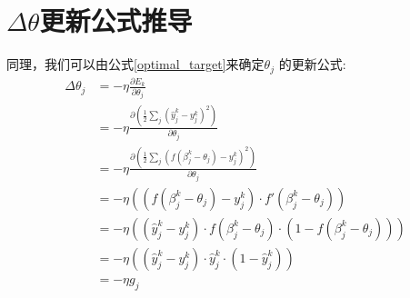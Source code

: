 \documentclass[11pt]{report}
\begin{document}
\section{$\Delta \theta$更新公式推导}
同理，我们可以由公式\ref{optimal_target}来确定$\theta_j$	的更新公式:
\begin{equation}
	\begin{split}
		\Delta \theta_j &=-\eta\frac{\partial E_k}{\partial \theta_j}\\
		&=-\eta\frac{\partial\left(\frac{1}{2}\sum_j(\hat{y}_j^k-y_j^k)^2 \right)}{\partial \theta_j}\\
		&=-\eta\frac{\partial\left(\frac{1}{2}\sum_j(f(\beta_j^k-\theta_j)-y_j^k)^2 \right)}{\partial \theta_j}\\
		&=-\eta\left((f(\beta_j^k-\theta_j)-y_j^k)\cdot f'(\beta_j^k-\theta_j) \right)\\
		&=-\eta\left((\hat{y}_j^k-y_j^k)\cdot f(\beta_j^k-\theta_j)\cdot (1-f(\beta_j^k-\theta_j) )\right)\\
		&=-\eta\left((\hat{y}_j^k-y_j^k)\cdot \hat{y}_j^k \cdot (1-\hat{y}_j^k) \right)\\
		&=-\eta g_j
	\end{split}
\end{equation}



































 
\end{document}
